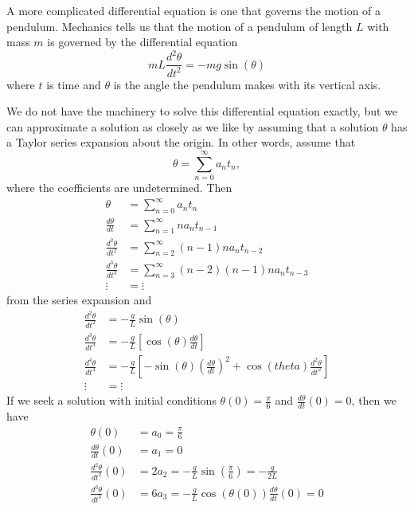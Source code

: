 \begin{exercises}
    \ea

\begin{exerciseSolution}

\item A more complicated differential equation is one that governs the motion of a pendulum. Mechanics tells us that the motion of a pendulum of length $L$ with mass $m$ is governed by the differential equation
\[mL \frac{d^2 \theta}{d t^2} = -mg \sin(\theta)\]
where $t$ is time and $\theta$ is the angle the pendulum makes with its vertical axis.

We do not have the machinery to solve this differential equation exactly, but we can approximate a solution as closely as we like by assuming that a solution $\theta$ has a Taylor series expansion about the origin. In other words, assume that
\[\theta = \sum_{n=0}^{\infty} a_nt_n,\]
where the coefficients are undetermined. Then
\begin{align*}
\theta &= \sum_{n=0}^{\infty} a_nt_n \\
\frac{d \theta}{dt} &= \sum_{n=1}^{\infty} na_nt_{n-1} \\
\frac{d^2 \theta}{dt^2} &= \sum_{n=2}^{\infty} (n-1)na_nt_{n-2} \\
\frac{d^3 \theta}{dt^3} &= \sum_{n=3}^{\infty} (n-2)(n-1)na_nt_{n-3} \\
\vdots &= \vdots
\end{align*}
from the series expansion and
\begin{align*}
\frac{d^2 \theta}{dt^2} &= -\frac{g}{L} \sin\left(\theta\right)  \\
\frac{d^3 \theta}{dt^3} &= -\frac{g}{L}\left[\cos(\theta)\frac{d \theta}{dt}\right]  \\
\frac{d^4 \theta}{dt^4} &= -\frac{g}{L}\left[-\sin(\theta)\left(\frac{d \theta}{dt}\right)^2 + \cos(theta)\frac{d^2 \theta}{dt^2} \right]  \\
\vdots &= \vdots
\end{align*}
If we seek a solution with initial conditions $\theta(0) = \frac{\pi}{6}$ and $\frac{d \theta}{dt}(0) = 0$, then we have
\begin{align*}
\theta(0) &= a_0 = \frac{\pi}{6} \\
\frac{d \theta}{dt}(0) &= a_1 = 0  \\
\frac{d^2 \theta}{dt^2}(0) &= 2a_2 = -\frac{g}{L} \sin\left(\frac{\pi}{6}\right) = -\frac{g}{2L}  \\
\frac{d^3 \theta}{dt^3}(0) &= 6a_3 = -\frac{g}{L}\cos(\theta(0))\frac{d \theta}{dt}(0) = 0  \\

\end{align*}
\end{exerciseSolution}
\end{exercises}
